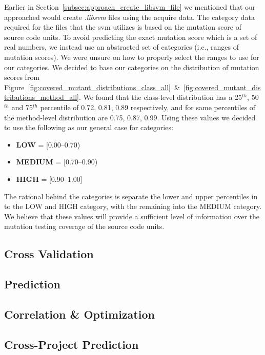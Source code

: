 Earlier in Section~\ref{subsec:approach_create_libsvm_file} we mentioned that our approached would create \emph{.libsvm} files using the acquire data. The category data required for the files that the \gls{svm} utilizes is based on the mutation score of source code units. To avoid predicting the exact mutation score which is a set of real numbers, we instead use an abstracted set of categories (i.e., ranges of mutation scores). We were unsure on how to properly select the ranges to use for our categories. We decided to base our categories on the distribution of mutation scores from Figure~\ref{fig:covered_mutant_distributions_class_all}~\&~\ref{fig:covered_mutant_distributions_method_all}. We found that the class-level distribution has a 25$^{th}$, 50$^{th}$ and 75$^{th}$ percentile of 0.72, 0.81, 0.89 respectively, and for same percentiles of the method-level distribution are 0.75, 0.87, 0.99. Using these values we decided to use the following as our general case for categories:

\begin{itemize}
  \item \textbf{LOW} = [0.00--0.70)
  \item \textbf{MEDIUM} = [0.70--0.90)
  \item \textbf{HIGH} = [0.90--1.00]
\end{itemize}

The rational behind the categories is separate the lower and upper percentiles in to the LOW and HIGH category, with the remaining into the MEDIUM category. We believe that these values will provide a sufficient level of information over the mutation testing coverage of the source code units.


\subsection{Cross Validation}
\label{subsec:experiment_cross_validation}


\subsection{Prediction}
\label{subsec:experiment_prediction}


\subsection{Correlation \& Optimization}
\label{subsec:experiment_correlation_optimization}


\subsection{Cross-Project Prediction}
\label{subsec:experiment_cross_project_prediction}


